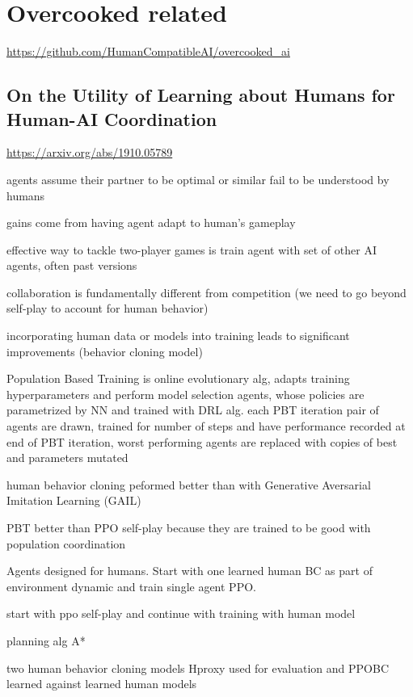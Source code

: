 \documentclass{report}
\begin{document}
\begin{list}{}{}
\end{list}

\chapter{Overcooked related}
\url{https://github.com/HumanCompatibleAI/overcooked_ai}

\section{On the Utility of Learning about Humans
for Human-AI Coordination}
\url{https://arxiv.org/abs/1910.05789}
\begin{list}{}{}
    \item agents assume their partner to be optimal or similar fail to be understood by humans
    \item gains come from having agent adapt to human's gameplay
    \item effective way to tackle two-player games is train agent with set of other AI agents, often past versions
    \item collaboration is fundamentally different from competition (we need to go beyond self-play to account for human behavior)
    \item incorporating human data or models into training leads to significant improvements (behavior cloning model)
    \item Population Based Training is online evolutionary alg, adapts training hyperparameters and perform model selection
    agents, whose policies are parametrized by NN and trained with DRL alg. each PBT iteration pair of agents are drawn, trained for number of steps and have performance recorded
    at end of PBT iteration, worst performing agents are replaced with copies of best and parameters mutated
    \item human behavior cloning peformed better than with Generative Aversarial Imitation Learning (GAIL)
    \item PBT better than PPO self-play because they are trained to be good with population coordination
    \item Agents designed for humans. Start with one learned human BC as part of environment dynamic and train single agent PPO.
    \item start with ppo self-play and continue with training with human model
    \item planning alg A*
    \item two human behavior cloning models Hproxy used for evaluation and PPOBC learned against learned human models

\end{list}
\end{document}
